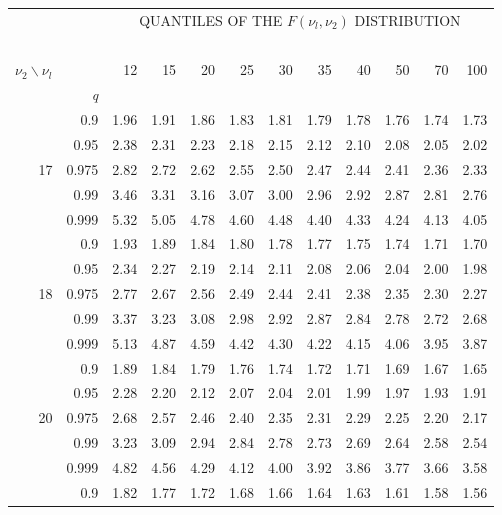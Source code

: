 \documentclass[12pt,a4paper,openany,twoside]{report}
\theoremstyle{definition}
\theoremstyle{remark}
\theoremstyle{plain}
\theoremstyle{definition}
\theoremstyle{definition}
\theoremstyle{definition}
\theoremstyle{remark}
\begin{document}
\newpage

\begin{center}
\begin{tabular}{rr@{\ \ }r@{\ \ }r@{\ \ }r@{\ \ }r@{\ \ }r@{\ \ }r@{\ \ }r@{\ \ }r@{\ \ }r@{\ \ }r@{ }}
& &\multicolumn{10}{c}{QUANTILES OF THE $F(\nu_l, \nu_2)$ DISTRIBUTION}\\
\ \\
$\nu_2\backslash\nu_l$ & & 12 & 15 & 20 & 25 & 30 & 35 & 40 & 50 & 70 & 100\\
 & \textit{q}  &  &  &  &  &  &  &  &  & & \\
\rule{0pt}{2.5ex} & 0.9 & 1.96 & 1.91 & 1.86 & 1.83 & 1.81 & 1.79 & 1.78 & 1.76 & 1.74 & 1.73\\
 & 0.95 & 2.38 & 2.31 & 2.23 & 2.18 & 2.15 & 2.12 & 2.10 & 2.08 & 2.05 & 2.02\\
17 & 0.975 & 2.82 & 2.72 & 2.62 & 2.55 & 2.50 & 2.47 & 2.44 & 2.41 & 2.36 & 2.33\\
 & 0.99 & 3.46 & 3.31 & 3.16 & 3.07 & 3.00 & 2.96 & 2.92 & 2.87 & 2.81 & 2.76\\
 & 0.999 & 5.32 & 5.05 & 4.78 & 4.60 & 4.48 & 4.40 & 4.33 & 4.24 & 4.13 & 4.05\\
\rule{0pt}{2.5ex} & 0.9 & 1.93 & 1.89 & 1.84 & 1.80 & 1.78 & 1.77 & 1.75 & 1.74 & 1.71 & 1.70\\
 & 0.95 & 2.34 & 2.27 & 2.19 & 2.14 & 2.11 & 2.08 & 2.06 & 2.04 & 2.00 & 1.98\\
18 & 0.975 & 2.77 & 2.67 & 2.56 & 2.49 & 2.44 & 2.41 & 2.38 & 2.35 & 2.30 & 2.27\\
 & 0.99 & 3.37 & 3.23 & 3.08 & 2.98 & 2.92 & 2.87 & 2.84 & 2.78 & 2.72 & 2.68\\
 & 0.999 & 5.13 & 4.87 & 4.59 & 4.42 & 4.30 & 4.22 & 4.15 & 4.06 & 3.95 & 3.87\\
\rule{0pt}{2.5ex} & 0.9 & 1.89 & 1.84 & 1.79 & 1.76 & 1.74 & 1.72 & 1.71 & 1.69 & 1.67 & 1.65\\
 & 0.95 & 2.28 & 2.20 & 2.12 & 2.07 & 2.04 & 2.01 & 1.99 & 1.97 & 1.93 & 1.91\\
20 & 0.975 & 2.68 & 2.57 & 2.46 & 2.40 & 2.35 & 2.31 & 2.29 & 2.25 & 2.20 & 2.17\\
 & 0.99 & 3.23 & 3.09 & 2.94 & 2.84 & 2.78 & 2.73 & 2.69 & 2.64 & 2.58 & 2.54\\
 & 0.999 & 4.82 & 4.56 & 4.29 & 4.12 & 4.00 & 3.92 & 3.86 & 3.77 & 3.66 & 3.58\\
\rule{0pt}{2.5ex} & 0.9 & 1.82 & 1.77 & 1.72 & 1.68 & 1.66 & 1.64 & 1.63 & 1.61 & 1.58 & 1.56\\

\end{tabular}
\end{center}
\end{document}
